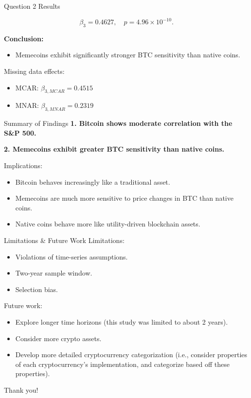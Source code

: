 \documentclass[12pt]{beamer}
\begin{document}
	\begin{frame}{Question 2 Results}
		
		$$\beta_3 = 0.4627,\quad p = 4.96 \times 10^{-10}.$$
		
		
		\textbf{Conclusion:}
		\begin{itemize}
			\item Memecoins exhibit significantly stronger BTC sensitivity than native coins.
		\end{itemize}
		
		Missing data effects:
		\begin{itemize}
			\item MCAR: $\beta_{3,MCAR} = 0.4515$
			\item MNAR: $\beta_{3,MNAR} = 0.2319$
		\end{itemize}
	\end{frame}
	
	\begin{frame}{Summary of Findings}
		\textbf{1. Bitcoin shows moderate correlation with the S\&P 500.}
		
		\textbf{2. Memecoins exhibit greater BTC sensitivity than native coins.}
		
		Implications:
		\begin{itemize}
			\item Bitcoin behaves increasingly like a traditional asset.
			\item Memecoins are much more sensitive to price changes in BTC than native coins. 
			\item Native coins behave more like utility-driven blockchain assets.
		\end{itemize}
	\end{frame}
	
	\begin{frame}{Limitations \& Future Work}
		Limitations:
		\begin{itemize}
			\item Violations of time-series assumptions.
			\item Two-year sample window.
			\item Selection bias. 
		\end{itemize}
		
		Future work:
		\begin{itemize}
			\item Explore longer time horizons (this study was limited to about 2 years).
			\item Consider more crypto assets. 
			\item Develop more detailed cryptocurrency categorization (i.e., consider properties of each cryptocurrency's implementation, and categorize based off these properties).
		\end{itemize}
	\end{frame}
	
	\begin{frame}{}
		\centering \Large Thank you!
	\end{frame}
	
\end{document}
